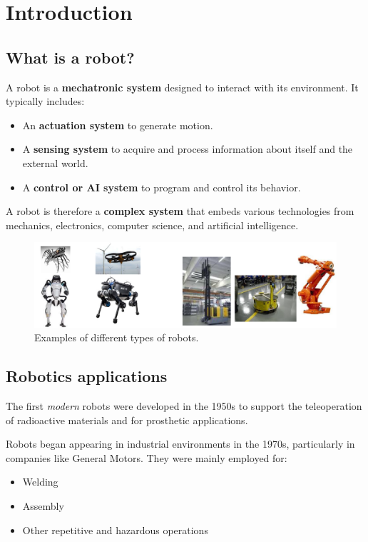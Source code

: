 \section{Introduction}

\subsection{What is a robot?}

A robot is a \textbf{mechatronic system} designed to interact with its environment. It typically includes:
\begin{itemize}
  \item An \textbf{actuation system} to generate motion.
  \item A \textbf{sensing system} to acquire and process information about itself and the external world.
  \item A \textbf{control or AI system} to program and control its behavior.
\end{itemize}

A robot is therefore a \textbf{complex system} that embeds various technologies from mechanics, electronics, computer science, and artificial intelligence.

\begin{figure}[H]
  \centering
  \includegraphics[width=\linewidth]{imgs/introduction_what_is_a_robot.png}
  \caption{Examples of different types of robots.}
\end{figure}

\hfill

\subsection{Robotics applications}

The first \textit{modern} robots were developed in the 1950s to support the teleoperation of radioactive materials and for prosthetic applications.

Robots began appearing in industrial environments in the 1970s, particularly in companies like General Motors. They were mainly employed for:
\begin{itemize}
  \item Welding
  \item Assembly
  \item Other repetitive and hazardous operations
\end{itemize}

